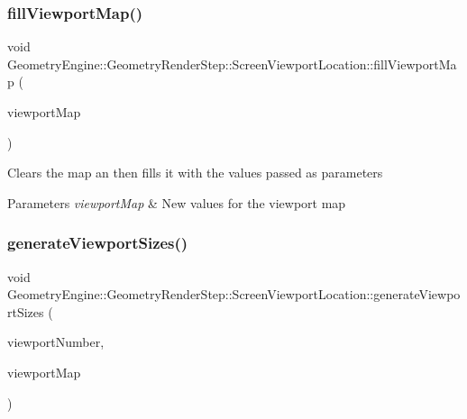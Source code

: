 \subsubsection{\texorpdfstring{fillViewportMap()}{fillViewportMap()}}
{\footnotesize\ttfamily void Geometry\+Engine\+::\+Geometry\+Render\+Step\+::\+Screen\+Viewport\+Location\+::fill\+Viewport\+Map (\begin{DoxyParamCaption}\item[{const std\+::map$<$ \mbox{\hyperlink{namespace_geometry_engine_1_1_geometry_world_item_1_1_geometry_camera_a3766848bae97ff8203fa26907ac359ef}{Geometry\+World\+Item\+::\+Geometry\+Camera\+::\+Camera\+Targets}}, Q\+Vector4D $>$ \&}]{viewport\+Map }\end{DoxyParamCaption})\hspace{0.3cm}{\ttfamily [protected]}}

Clears the map an then fills it with the values passed as parameters 
\begin{DoxyParams}{Parameters}
{\em viewport\+Map} & New values for the viewport map \\
\hline
\end{DoxyParams}
\mbox{\label{class_geometry_engine_1_1_geometry_render_step_1_1_screen_viewport_location_ae4caebeff48aecdbd559be7ae3a3799d}} 
\subsubsection{\texorpdfstring{generateViewportSizes()}{generateViewportSizes()}}
{\footnotesize\ttfamily void Geometry\+Engine\+::\+Geometry\+Render\+Step\+::\+Screen\+Viewport\+Location\+::generate\+Viewport\+Sizes (\begin{DoxyParamCaption}\item[{int}]{viewport\+Number,  }\item[{std\+::map$<$ \mbox{\hyperlink{namespace_geometry_engine_1_1_geometry_world_item_1_1_geometry_camera_a3766848bae97ff8203fa26907ac359ef}{Geometry\+World\+Item\+::\+Geometry\+Camera\+::\+Camera\+Targets}}, Q\+Vector4D $>$ \&}]{viewport\+Map }\end{DoxyParamCaption})\hspace{0.3cm}{\ttfamily [protected]}}

